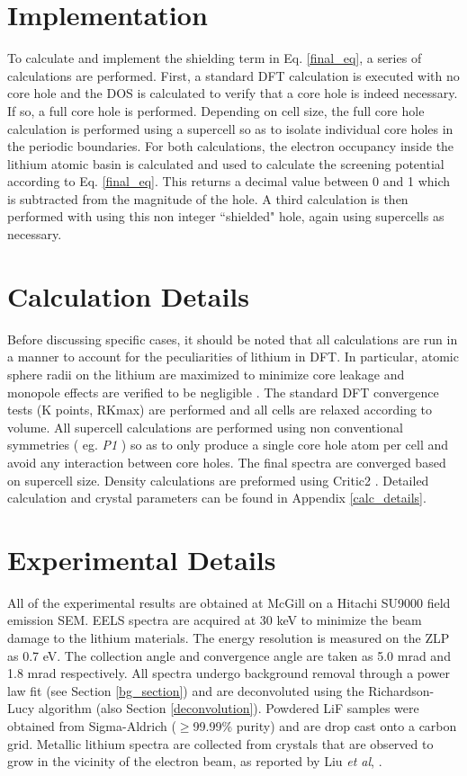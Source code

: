 \section{Implementation} \label{implementation}
To calculate and implement the shielding term in Eq. \ref{final_eq}, a series of calculations are performed.  First, a standard DFT calculation is executed with no core hole and the DOS is calculated to verify that a core hole is indeed necessary.  If so, a full core hole is performed. Depending on cell size, the full core hole calculation is performed using a supercell so as to isolate individual core holes in the periodic boundaries. For both calculations, the electron occupancy inside the lithium atomic basin is calculated and used to calculate the screening potential according to Eq. \ref{final_eq}.  This returns a decimal value between 0 and 1 which is subtracted from the magnitude of the hole.  A third calculation is then performed with using this non integer ``shielded" hole, again using supercells as necessary.  

\section{Calculation Details} \label{calc_section}
Before discussing specific cases, it should be noted that all calculations are run in a manner to account for the peculiarities of lithium in DFT. In particular, atomic sphere radii on the lithium are maximized to minimize core leakage and monopole effects are verified to be negligible \cite{mauchamp_ab_2006}.  The standard DFT convergence tests (K points, RKmax) are performed and all cells are relaxed according to volume.  All supercell calculations are performed using non conventional symmetries ( eg. \textit{P1} ) so as to only produce a single core hole atom per cell and avoid any interaction between core holes. The final spectra are  converged based on supercell size.  Density calculations are preformed using Critic2 \cite{critic2}.   Detailed calculation and crystal parameters can be found in Appendix \ref{calc_details}. \\


\section{Experimental Details} \label{expt_methods}
All of the experimental results are obtained at McGill on a Hitachi SU9000 field emission SEM.  EELS spectra are acquired at 30 keV to minimize the beam damage to the lithium materials. The energy resolution is measured on the ZLP as 0.7 eV.  The collection angle and convergence angle are taken as 5.0 mrad and 1.8 mrad respectively.  All spectra undergo  background removal through a power law fit (see Section \ref{bg_section}) and are deconvoluted using the Richardson-Lucy algorithm (also Section \ref{deconvolution}).   Powdered LiF samples were obtained from Sigma-Aldrich ($\ge$99.99\% purity) and are drop cast onto a carbon grid.  Metallic lithium spectra are collected from crystals that are observed to grow in the vicinity of the electron beam, as reported by Liu \textit{et al}, \cite{liu_preparation_1986, egerton_electron_1987}.
